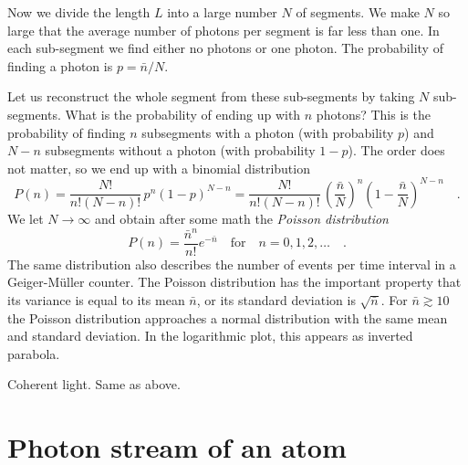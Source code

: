 Now we divide the length $L$ into a large number $N$ of segments. We make $N$ so large that the average number of photons per segment is far less than one. In each sub-segment we find either no photons or one photon. The probability of finding a photon is $p = \bar{n} / N$.


Let us reconstruct the whole segment from these sub-segments by taking $N$ sub-segments. What is the probability of ending up with $n$ photons? This is the probability of finding $n$ subsegments with a photon (with probability $p$) and $N-n$ subsegments without a photon (with probability $1-p$). The order does not matter, so we end up with a binomial distribution
\begin{equation}
    P(n) = \frac{N!}{n! (N -n)!} \, p^n (1-p)^{N-n}
 =
 \frac{N!}{n! (N -n)!} \, \left( \frac{\bar{n}}{N}\right)^n \left(1- \frac{\bar{n}}{N} \right)^{N-n}  \quad .
\end{equation}
We let  $N \rightarrow \infty$ and obtain after some math the \emph{Poisson distribution}
\begin{equation}
    P(n) = \frac{\bar{n}^n}{n!} e^{- \bar{n}} \quad \text{for} \quad n = 0, 1, 2, \dots \quad .
\end{equation}
The same distribution also describes the number of events per time interval in a Geiger-Müller counter. The Poisson distribution has the important property that its variance is equal to its mean $\bar{n}$, or its standard deviation is $\sqrt{\bar{n}}$. For $\bar{n} \gtrsim 10$ the Poisson distribution approaches a normal distribution with the same mean and standard deviation. In the logarithmic plot, this appears as inverted parabola. 

\begin{marginfigure}
    \caption{Coherent light. Same as above. }
\end{marginfigure}


\section{Photon stream of an atom}

